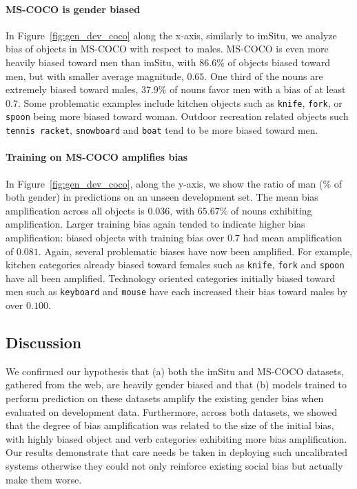\paragraph{MS-COCO is gender biased}
In Figure~\ref{fig:gen_dev_coco} along the x-axis, similarly to imSitu, we analyze bias of objects in MS-COCO with respect to males. 
MS-COCO is even more heavily biased toward men than imSitu, with $86.6\%$ of objects biased toward men, but with smaller average magnitude, $0.65$.
One third of the nouns are extremely biased toward males, 37.9\% of nouns favor men with a bias of at least $0.7$.
Some problematic examples include kitchen objects such as \texttt{knife}, \texttt{fork}, or \texttt{spoon} being more biased toward woman.
Outdoor recreation related objects such \texttt{tennis racket}, \texttt{snowboard} and \texttt{boat} tend to be more biased toward men.

\paragraph{Training on MS-COCO amplifies bias}
In Figure~\ref{fig:gen_dev_coco}, along the y-axis, we show the ratio of man {(\% of both gender)} in predictions on an unseen development set.
The mean bias amplification across all objects is $0.036$, with $65.67\%$ of nouns exhibiting amplification.
Larger training bias again tended to indicate higher bias amplification: biased objects with training bias over $0.7$ had mean amplification of $0.081$.
Again, several problematic biases have now been amplified.
For example, kitchen categories already biased toward females such as \texttt{knife}, \texttt{fork} and \texttt{spoon} have all been amplified.
Technology oriented categories initially biased toward men such as \texttt{keyboard} and \texttt{mouse} have each increased their bias toward males by over $0.100$.

\subsection{Discussion}
We confirmed our hypothesis that (a) both the imSitu and MS-COCO datasets, gathered from the web, are heavily gender biased and that (b) models trained to perform prediction on these datasets amplify the existing gender bias when evaluated on development data.
Furthermore, across both datasets, we showed that the degree of bias amplification was related to the size of the initial bias, with highly biased object and verb categories exhibiting more bias amplification.
Our results demonstrate that care needs be taken in deploying such uncalibrated systems otherwise they could not only reinforce existing social bias but actually make them worse.
